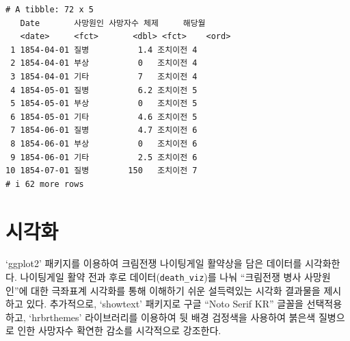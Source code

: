 \documentclass[
  letterpaper,
  chapter,a4paper,showtrims,openright,hidelinks]{oblivoir}
\begin{document}
\begin{verbatim}
# A tibble: 72 x 5
   Date       사망원인 사망자수 체제     해당월
   <date>     <fct>       <dbl> <fct>    <ord> 
 1 1854-04-01 질병          1.4 조치이전 4     
 2 1854-04-01 부상          0   조치이전 4     
 3 1854-04-01 기타          7   조치이전 4     
 4 1854-05-01 질병          6.2 조치이전 5     
 5 1854-05-01 부상          0   조치이전 5     
 6 1854-05-01 기타          4.6 조치이전 5     
 7 1854-06-01 질병          4.7 조치이전 6     
 8 1854-06-01 부상          0   조치이전 6     
 9 1854-06-01 기타          2.5 조치이전 6     
10 1854-07-01 질병        150   조치이전 7     
# i 62 more rows
\end{verbatim}

\hypertarget{uxc2dcuxac01uxd654}{%
\section{시각화}\label{uxc2dcuxac01uxd654}}

`ggplot2' 패키지를 이용하여 크림전쟁 나이팅게일 활약상을 담은 데이터를
시각화한다. 나이팅게일 활약 전과 후로 데이터(\texttt{death\_viz})를 나눠
``크림전쟁 병사 사망원인''에 대한 극좌표계 시각화를 통해 이해하기 쉬운
설득력있는 시각화 결과물을 제시하고 있다. 추가적으로, `showtext'
패키지로 구글 ``Noto Serif KR'' 글꼴을 선택적용하고, `hrbrthemes'
라이브러리를 이용하여 뒷 배경 검정색을 사용하여 붉은색 질병으로 인한
사망자수 확연한 감소를 시각적으로 강조한다.
\end{document}
